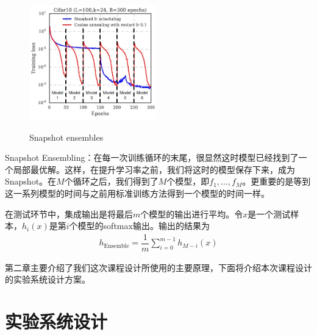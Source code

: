 \documentclass[supercite]{HustGraduPaper}
\begin{document}
\begin{sloppypar}
\begin{figure}[H]
    \hspace{2em}%
        {\includegraphics[height=5cm]{17.jpg}}
  
    \caption{Snapshot ensembles}
    \end{figure}

  Snapshot Ensembling：在每一次训练循环的末尾，很显然这时模型已经找到了一个局部最优解。这样，在提升学习率之前，我们将这时的模型保存下来，成为Snapshot。在$M$个循环之后，我们得到了$M$个模型，即$f_1,\dots,f_M$。更重要的是等到这一系列模型的时间与之前用标准训练方法得到一个模型的时间一样。

  在测试环节中，集成输出是将最后$m$个模型的输出进行平均。令$x$是一个测试样本，$h_i(x)$是第$i$个模型的softmax输出。输出的结果为\begin{gather}
    h_{\text{Ensemble}}=\dfrac{1}{m}\sum\limits^{m-1}_{i=0}h_{M-i}(x)
  \end{gather}

  第二章主要介绍了我们这次课程设计所使用的主要原理，下面将介绍本次课程设计的实验系统设计方案。
  \section{实验系统设计}

\end{sloppypar}
\end{document}
